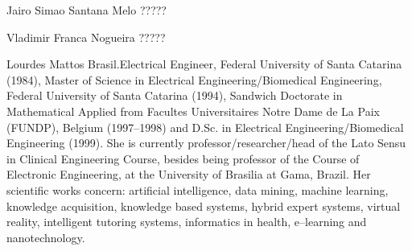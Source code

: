 \documentclass[journal]{IEEEtran}
\begin{document}
\begin{IEEEbiography}{Jairo Simao Santana Melo}
	?????
\end{IEEEbiography}

\begin{IEEEbiography}{Vladimir Franca Nogueira}
	?????
\end{IEEEbiography}


\begin{IEEEbiography}{Lourdes Mattos Brasil}.Electrical Engineer, Federal University of
Santa Catarina (1984), Master of Science in Electrical
Engineering/Biomedical Engineering, Federal University of Santa
Catarina (1994), Sandwich Doctorate in Mathematical Applied from
Facultes Universitaires Notre Dame de La Paix (FUNDP), Belgium
(1997–1998) and D.Sc. in Electrical Engineering/Biomedical Engineering
(1999). She is currently professor/researcher/head of the Lato Sensu
in Clinical Engineering Course, besides being professor of the Course
of Electronic Engineering, at the University of Brasilia at Gama,
Brazil. Her scientific works concern: artificial intelligence, data
mining, machine learning, knowledge acquisition, knowledge based
systems, hybrid expert systems, virtual reality, intelligent tutoring
systems, informatics in health, e–learning and nanotechnology.
\end{IEEEbiography}







\end{document}

